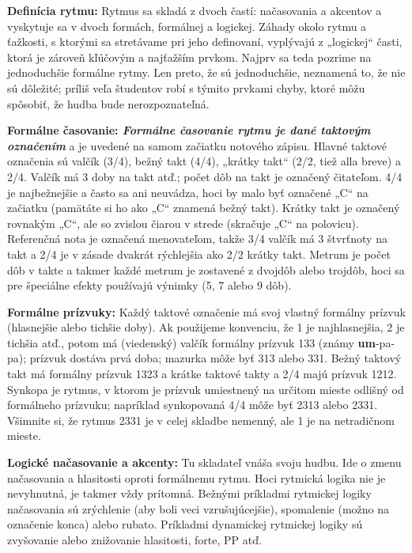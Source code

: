 \documentclass[11pt,a4paper%
]{book}
\begin{document}
\textbf{Definícia rytmu:} Rytmus sa skladá z dvoch častí: načasovania a akcentov a vyskytuje sa v dvoch formách, formálnej a logickej. Záhady okolo rytmu a ťažkosti, s ktorými sa stretávame pri jeho definovaní, vyplývajú z „logickej`` časti, ktorá je zároveň kľúčovým a najťažším prvkom. Najprv sa teda pozrime na jednoduchšie formálne rytmy. Len preto, že sú jednoduchšie, neznamená to, že nie sú dôležité; príliš veľa študentov robí s týmito prvkami chyby, ktoré môžu spôsobiť, že hudba bude nerozpoznateľná.

\textbf{Formálne časovanie: \emph{Formálne časovanie rytmu je dané taktovým označením}} a je uvedené na samom začiatku notového zápisu. Hlavné taktové označenia sú valčík (3/4), bežný takt (4/4), „krátky takt`` (2/2, tiež alla breve) a 2/4. Valčík má 3 doby na takt atď.; počet dôb na takt je označený čitateľom. 4/4 je najbežnejšie a často sa ani neuvádza, hoci by malo byť označené „C`` na začiatku (pamätáte si ho ako „C`` znamená bežný takt). Krátky takt je označený rovnakým „C``, ale so zvislou čiarou v strede (skračuje „C`` na polovicu). Referenčná nota je označená menovateľom, takže 3/4 valčík má 3 štvrťnoty na takt a 2/4 je v zásade dvakrát rýchlejšia ako 2/2 krátky takt. Metrum je počet dôb v takte a takmer každé metrum je zostavené z dvojdôb alebo trojdôb, hoci sa pre špeciálne efekty používajú výnimky (5, 7 alebo 9 dôb).

\textbf{Formálne prízvuky:} Každý taktové označenie má svoj vlastný formálny prízvuk (hlasnejšie alebo tichšie doby). Ak použijeme konvenciu, že 1 je najhlasnejšia, 2 je tichšia atď., potom má (viedenský) valčík formálny prízvuk 133 (známy \textbf{um}-pa-pa); prízvuk dostáva prvá doba; mazurka môže byť 313 alebo 331. Bežný taktový takt má formálny prízvuk 1323 a krátke taktové takty a 2/4 majú prízvuk 1212. Synkopa je rytmus, v ktorom je prízvuk umiestnený na určitom mieste odlišný od formálneho prízvuku; napríklad synkopovaná 4/4 môže byť 2313 alebo 2331. Všimnite si, že rytmus 2331 je v celej skladbe nemenný, ale 1 je na netradičnom mieste.

\textbf{Logické načasovanie a akcenty:} Tu skladateľ vnáša svoju hudbu. Ide o zmenu načasovania a hlasitosti oproti formálnemu rytmu. Hoci rytmická logika nie je nevyhnutná, je takmer vždy prítomná. Bežnými príkladmi rytmickej logiky načasovania sú zrýchlenie (aby boli veci vzrušujúcejšie), spomalenie (možno na označenie konca) alebo rubato. Príkladmi dynamickej rytmickej logiky sú zvyšovanie alebo znižovanie hlasitosti, forte, PP atď.
\end{document}
